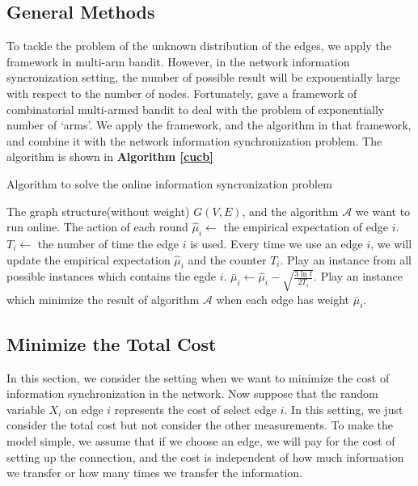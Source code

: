 \documentclass{article}
\theoremstyle{plain}
\theoremstyle{definition}
\theoremstyle{remark}
\begin{document}
    \subsection{General Methods}
    To tackle the problem of the unknown distribution of the edges, we apply the framework in multi-arm bandit. However, in the network information syncronization setting, the number of possible result will be exponentially large with respect to the number of nodes. Fortunately, \cite{chen2013combinatorial} gave a framework of combinatorial multi-armed bandit to deal with the problem of exponentially number of `arms'. We apply the framework, and the algorithm in that framework, and combine it with the network information synchronization problem. The algorithm is shown in \textbf{Algorithm \ref{cucb}}

    \begin{algorithm}
        \caption{Algorithm to solve the online information syncronization problem}
        \label{cucb}
        \begin{algorithmic}[1]
        \Require The graph structure(without weight) $G(V,E)$, and the algorithm $\mathcal A$ we want to run online.
        \Ensure The action of each round
            \State $\hat \mu_i \leftarrow$ the empirical expectation of edge $i$.
            \State $T_i \leftarrow$ the number of time the edge $i$ is used.
            \State Every time we use an edge $i$, we will update the empirical expectation $\hat \mu_i$ and the counter $T_i$.
                \State Play an instance from all possible instances which contains the egde $i$.
            \EndFor
                \State $\bar\mu_i \leftarrow \hat\mu_i - \sqrt{\frac{3\ln t}{2T_i}}$.
                \State Play an instance which minimize the result of algorithm $\mathcal A$ when each edge has weight $\bar\mu_i$.
            \EndFor
        \EndProcedure
        \end{algorithmic}
    \end{algorithm}

    \subsection{Minimize the Total Cost}
    In this section, we consider the setting when we want to minimize the cost of information synchronization in the network. Now suppose that the random variable $X_i$ on edge $i$ represents the cost of select edge $i$. In this setting, we just consider the total cost but not consider the other measurements. To make the model simple, we assume that if we choose an edge, we will pay for the cost of setting up the connection, and the cost is independent of how much information we transfer or how many times we transfer the information.\\
    
\end{document}
